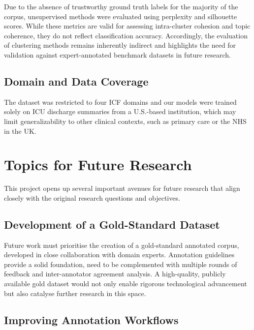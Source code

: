 Due to the absence of trustworthy ground truth labels for the majority of the corpus, unsupervised methods were evaluated using perplexity and silhouette scores. While these metrics are valid for assessing intra-cluster cohesion and topic coherence, they do not reflect classification accuracy. Accordingly, the evaluation of clustering methods remains inherently indirect and highlights the need for validation against expert-annotated benchmark datasets in future research.

\subsection{Domain and Data Coverage}

The dataset was restricted to four ICF domains and our models were trained solely on ICU discharge summaries from a U.S.-based institution, which may limit generalizability to other clinical contexts, such as primary care or the NHS in the UK.

\section{Topics for Future Research}

This project opens up several important avenues for future research that align closely with the original research questions and objectives.

\subsection{Development of a Gold-Standard Dataset}

Future work must prioritise the creation of a gold-standard annotated corpus, developed in close collaboration with domain experts. Annotation guidelines provide a solid foundation, need to be complemented with multiple rounds of feedback and inter-annotator agreement analysis. A high-quality, publicly available gold dataset would not only enable rigorous technological advancement but also catalyse further research in this space.

\subsection{Improving Annotation Workflows}

